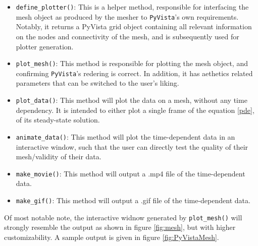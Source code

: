 \documentclass[headings=standardclasses, abstract=true]{scrartcl}
\begin{document}
\begin{itemize}
    \item \texttt{define\_plotter()}: This is a helper method, responsible for interfacing the mesh object as produced by the mesher to \texttt{PyVista}'s own requirements. Notably, it returns a PyVista grid object containing all relevant information on the nodes and connectivity of the mesh, and is subsequently used for plotter generation.
    \item \texttt{plot\_mesh()}: This method is responsible for plotting the mesh object, and confirming \texttt{PyVista}'s redering is correct. In addition, it has aethetics related parameters that can be switched to the user's liking.
    \item \texttt{plot\_data()}: This method will plot the data on a mesh, without any time dependency. It is intended to either plot a single frame of the equation \ref{pde}, of its steady-state solution.
    \item \texttt{animate\_data()}: This method will plot the time-dependent data in an interactive window, such that the user can directly test the quality of their mesh/validity of their data.
    \item \texttt{make\_movie()}: This method will output a .mp4 file of the time-dependent data.
    \item \texttt{make\_gif()}: This method will output a .gif file of the time-dependent data.
\end{itemize}

Of most notable note, the interactive widnow generated by \texttt{plot\_mesh()} will strongly resemble the output as shown in figure \ref{fig:mesh}, but with higher customizability. A sample output is given in figure \ref{fig:PyVistaMesh}.
\end{document}
